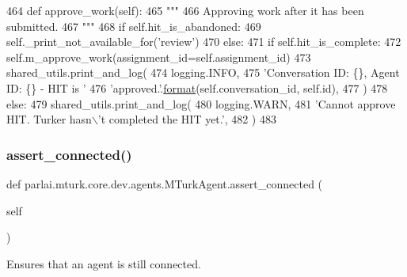 \begin{DoxyCode}
464     \textcolor{keyword}{def }approve\_work(self):
465         \textcolor{stringliteral}{"""}
466 \textcolor{stringliteral}{        Approving work after it has been submitted.}
467 \textcolor{stringliteral}{        """}
468         \textcolor{keywordflow}{if} self.hit\_is\_abandoned:
469             self.\_print\_not\_available\_for(\textcolor{stringliteral}{'review'})
470         \textcolor{keywordflow}{else}:
471             \textcolor{keywordflow}{if} self.hit\_is\_complete:
472                 self.m\_approve\_work(assignment\_id=self.assignment\_id)
473                 shared\_utils.print\_and\_log(
474                     logging.INFO,
475                     \textcolor{stringliteral}{'Conversation ID: \{\}, Agent ID: \{\} - HIT is '}
476                     \textcolor{stringliteral}{'approved.'}.\hyperlink{namespaceparlai_1_1chat__service_1_1services_1_1messenger_1_1shared__utils_a32e2e2022b824fbaf80c747160b52a76}{format}(self.conversation\_id, self.id),
477                 )
478             \textcolor{keywordflow}{else}:
479                 shared\_utils.print\_and\_log(
480                     logging.WARN,
481                     \textcolor{stringliteral}{'Cannot approve HIT. Turker hasn\(\backslash\)'t completed the HIT yet.'},
482                 )
483 
\end{DoxyCode}
\mbox{\label{classparlai_1_1mturk_1_1core_1_1dev_1_1agents_1_1MTurkAgent_a9761bfc34d22aae02017a258276dfaa8}} 
\subsubsection{\texorpdfstring{assert\+\_\+connected()}{assert\_connected()}}
{\footnotesize\ttfamily def parlai.\+mturk.\+core.\+dev.\+agents.\+M\+Turk\+Agent.\+assert\+\_\+connected (\begin{DoxyParamCaption}\item[{}]{self }\end{DoxyParamCaption})}

\begin{DoxyVerb}Ensures that an agent is still connected.
\end{DoxyVerb}
 

